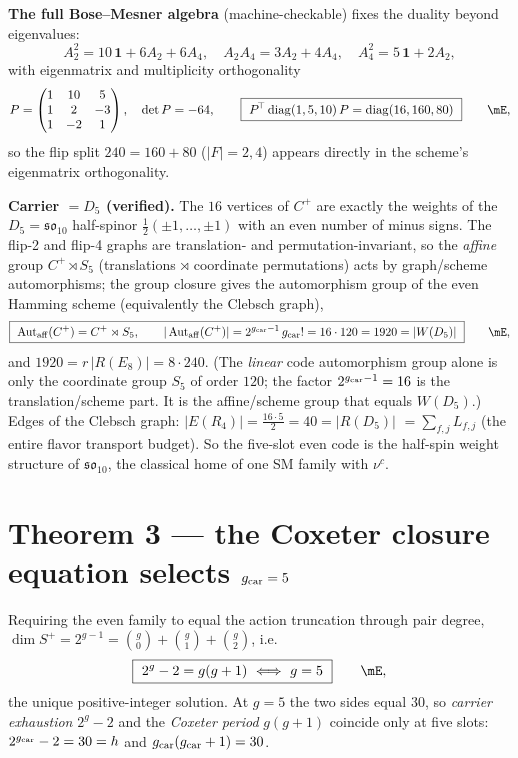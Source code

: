 \noindent\textbf{The full Bose--Mesner algebra} (machine-checkable) fixes the duality beyond
eigenvalues:
\begin{equation}
  A_2^2=10\,\mathbf 1+6A_2+6A_4,\quad A_2A_4=3A_2+4A_4,\quad A_4^2=5\,\mathbf 1+2A_2 ,
\end{equation}
with eigenmatrix and multiplicity orthogonality
\begin{equation}
  P=\begin{pmatrix}1&10&5\\1&2&-3\\1&-2&1\end{pmatrix},\quad \det P=-64,\qquad
  \boxed{\ P^{\!\top}\operatorname{diag}(1,5,10)\,P=\operatorname{diag}(16,160,80)\ }\qquad\mE ,
\end{equation}
so the flip split $240=160+80$ ($|F|=2,4$) appears directly in the scheme's eigenmatrix orthogonality.

\noindent\textbf{Carrier $=D_5$ (verified).} The $16$ vertices of $C^+$ are exactly the weights of the
$D_5=\mathfrak{so}_{10}$ half-spinor $\tfrac12(\pm1,\dots,\pm1)$ with an even number of minus signs.
The flip-2 and flip-4 graphs are translation- and permutation-invariant, so the \emph{affine} group
$C^+\rtimes S_5$ (translations $\rtimes$ coordinate permutations) acts by graph/scheme automorphisms; the
group closure gives the automorphism group of the even Hamming scheme (equivalently the Clebsch graph),
\begin{equation}
  \boxed{\ \operatorname{Aut}_{\mathrm{aff}}(C^+)=C^+\rtimes S_5,\qquad |\operatorname{Aut}_{\mathrm{aff}}(C^+)|=2^{\gcar-1}\,\gcar!=16\cdot120=1920=|W(D_5)|\ }\qquad\mE ,
\end{equation}
and $1920=r\,|R(E_8)|=8\cdot240$. (The \emph{linear} code automorphism group alone is only the
coordinate group $S_5$ of order $120$; the factor $2^{g_{\mathrm{car}}-1}=16$ is the translation/scheme part. It is
the affine/scheme group that equals $W(D_5)$.) Edges of the Clebsch graph: $|E(R_4)|=\tfrac{16\cdot5}{2}=40=|R(D_5)|$
$=\sum_{f,j}L_{f,j}$ (the entire flavor transport budget). So the five-slot even code is the half-spin
weight structure of $\mathfrak{so}_{10}$, the classical home of one SM family with $\nu^c$.

\section*{Theorem 3 --- the Coxeter closure equation selects $g_{\mathrm{car}}=5$}
Requiring the even family to equal the action truncation through pair degree,
$\dim S^+=2^{g-1}=\binom g0+\binom g1+\binom g2$, i.e.
\begin{equation}
  \boxed{\ 2^{g}-2=g(g+1)\ \Longleftrightarrow\ g=5\ }\qquad\mE,
\end{equation}
the unique positive-integer solution. At $g=5$ the two sides equal $30$, so
\emph{carrier exhaustion} $2^{g}-2$ and the \emph{Coxeter period} $g(g+1)$ coincide only at five
slots: $2^{g_{\mathrm{car}}}-2=30=h$ and $g_{\mathrm{car}}(g_{\mathrm{car}}+1)=30$.

